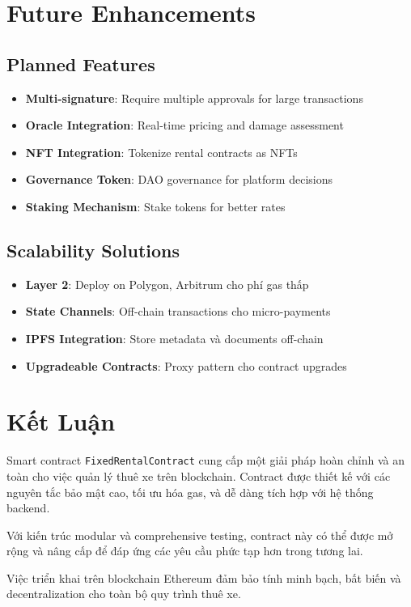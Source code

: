 \documentclass[12pt,a4paper]{article}
\begin{document}
\section{Future Enhancements}

\subsection{Planned Features}
\begin{itemize}
\item \textbf{Multi-signature}: Require multiple approvals for large transactions
\item \textbf{Oracle Integration}: Real-time pricing and damage assessment
\item \textbf{NFT Integration}: Tokenize rental contracts as NFTs
\item \textbf{Governance Token}: DAO governance for platform decisions
\item \textbf{Staking Mechanism}: Stake tokens for better rates
\end{itemize}

\subsection{Scalability Solutions}
\begin{itemize}
\item \textbf{Layer 2}: Deploy on Polygon, Arbitrum cho phí gas thấp
\item \textbf{State Channels}: Off-chain transactions cho micro-payments
\item \textbf{IPFS Integration}: Store metadata và documents off-chain
\item \textbf{Upgradeable Contracts}: Proxy pattern cho contract upgrades
\end{itemize}

\section{Kết Luận}

Smart contract \texttt{FixedRentalContract} cung cấp một giải pháp hoàn chỉnh và an toàn cho việc quản lý thuê xe trên blockchain. Contract được thiết kế với các nguyên tắc bảo mật cao, tối ưu hóa gas, và dễ dàng tích hợp với hệ thống backend.

Với kiến trúc modular và comprehensive testing, contract này có thể được mở rộng và nâng cấp để đáp ứng các yêu cầu phức tạp hơn trong tương lai.

Việc triển khai trên blockchain Ethereum đảm bảo tính minh bạch, bất biến và decentralization cho toàn bộ quy trình thuê xe.
\end{document}
